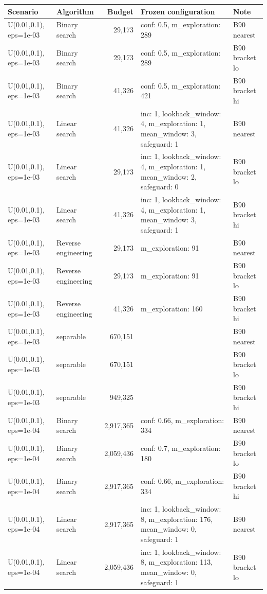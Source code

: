 \begin{tabular}{llrll}
\toprule
Scenario & Algorithm & Budget & Frozen configuration & Note \\
\midrule
U(0.01,0.1), eps=1e-03 & Binary search & 29,173 & conf: 0.5, m\_exploration: 289 & B90 nearest \\
U(0.01,0.1), eps=1e-03 & Binary search & 29,173 & conf: 0.5, m\_exploration: 289 & B90 bracket lo \\
U(0.01,0.1), eps=1e-03 & Binary search & 41,326 & conf: 0.5, m\_exploration: 421 & B90 bracket hi \\
U(0.01,0.1), eps=1e-03 & Linear search & 41,326 & inc: 1, lookback\_window: 4, m\_exploration: 1, mean\_window: 3, safeguard: 1 & B90 nearest \\
U(0.01,0.1), eps=1e-03 & Linear search & 29,173 & inc: 1, lookback\_window: 4, m\_exploration: 1, mean\_window: 2, safeguard: 0 & B90 bracket lo \\
U(0.01,0.1), eps=1e-03 & Linear search & 41,326 & inc: 1, lookback\_window: 4, m\_exploration: 1, mean\_window: 3, safeguard: 1 & B90 bracket hi \\
U(0.01,0.1), eps=1e-03 & Reverse engineering & 29,173 & m\_exploration: 91 & B90 nearest \\
U(0.01,0.1), eps=1e-03 & Reverse engineering & 29,173 & m\_exploration: 91 & B90 bracket lo \\
U(0.01,0.1), eps=1e-03 & Reverse engineering & 41,326 & m\_exploration: 160 & B90 bracket hi \\
U(0.01,0.1), eps=1e-03 & separable & 670,151 &  & B90 nearest \\
U(0.01,0.1), eps=1e-03 & separable & 670,151 &  & B90 bracket lo \\
U(0.01,0.1), eps=1e-03 & separable & 949,325 &  & B90 bracket hi \\
U(0.01,0.1), eps=1e-04 & Binary search & 2,917,365 & conf: 0.66, m\_exploration: 334 & B90 nearest \\
U(0.01,0.1), eps=1e-04 & Binary search & 2,059,436 & conf: 0.7, m\_exploration: 180 & B90 bracket lo \\
U(0.01,0.1), eps=1e-04 & Binary search & 2,917,365 & conf: 0.66, m\_exploration: 334 & B90 bracket hi \\
U(0.01,0.1), eps=1e-04 & Linear search & 2,917,365 & inc: 1, lookback\_window: 8, m\_exploration: 176, mean\_window: 0, safeguard: 1 & B90 nearest \\
U(0.01,0.1), eps=1e-04 & Linear search & 2,059,436 & inc: 1, lookback\_window: 8, m\_exploration: 113, mean\_window: 0, safeguard: 1 & B90 bracket lo \\

\end{tabular}
